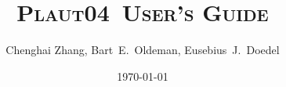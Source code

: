 \documentclass[12pt, openright, psfig]{article}
\newcommand{\PLAUT} {\textsc{Plaut04}}
\begin{document}
	\title{\textsc{\PLAUT~User's Guide}}
	\author{Chenghai Zhang, Bart~E.~Oldeman, Eusebius~J.~Doedel}

	\date{\today}
	\maketitle
\clearpage


\end{document}
